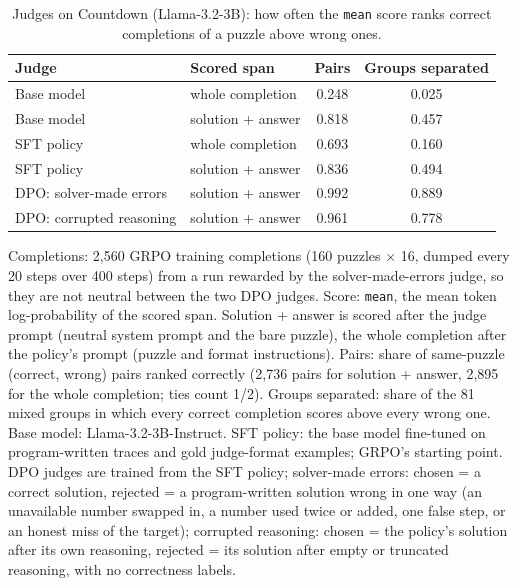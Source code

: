 \begin{table}[H]
\centering
\caption{Judges on Countdown (Llama-3.2-3B): how often the \texttt{mean} score ranks correct completions of a puzzle above wrong ones.}
\label{tab:judges-countdown}
\begin{threeparttable}
\begin{tabular}{llcc}
\toprule
Judge & Scored span & Pairs & Groups separated \\
\midrule
Base model & whole completion & 0.248 & 0.025 \\
Base model & solution + answer & 0.818 & 0.457 \\
SFT policy & whole completion & 0.693 & 0.160 \\
SFT policy & solution + answer & 0.836 & 0.494 \\
DPO: solver-made errors & solution + answer & 0.992 & 0.889 \\
DPO: corrupted reasoning & solution + answer & 0.961 & 0.778 \\
\bottomrule
\end{tabular}
\begin{tablenotes}\footnotesize
\item Completions: 2,560 GRPO training completions (160 puzzles $\times$ 16, dumped every 20 steps over 400 steps) from a run rewarded by the solver-made-errors judge, so they are not neutral between the two DPO judges. Score: \texttt{mean}, the mean token log-probability of the scored span. Solution + answer is scored after the judge prompt (neutral system prompt and the bare puzzle), the whole completion after the policy's prompt (puzzle and format instructions). Pairs: share of same-puzzle (correct, wrong) pairs ranked correctly (2,736 pairs for solution + answer, 2,895 for the whole completion; ties count 1/2). Groups separated: share of the 81 mixed groups in which every correct completion scores above every wrong one. Base model: Llama-3.2-3B-Instruct. SFT policy: the base model fine-tuned on program-written traces and gold judge-format examples; GRPO's starting point. DPO judges are trained from the SFT policy; solver-made errors: chosen = a correct solution, rejected = a program-written solution wrong in one way (an unavailable number swapped in, a number used twice or added, one false step, or an honest miss of the target); corrupted reasoning: chosen = the policy's solution after its own reasoning, rejected = its solution after empty or truncated reasoning, with no correctness labels.
\end{tablenotes}
\end{threeparttable}
\end{table}
